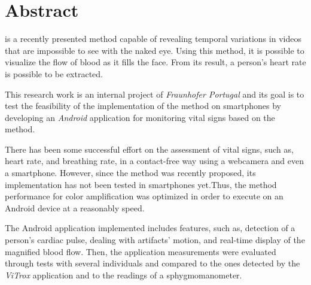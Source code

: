 \chapter*{Abstract}

\evm{} is a recently presented method capable of revealing temporal
variations in videos that are impossible to see with the naked eye.
Using this method, it is possible to visualize the flow of blood as
it fills the face. From its result, a person's heart rate is possible
to be extracted.

This research work is an internal project of \emph{Fraunhofer Portugal}
and its goal is to test the feasibility of the
implementation of the \evm{} method on smartphones by developing
an \emph{Android} application for monitoring vital signs based on
the \evm{} method.

There has been some successful effort on the assessment of vital
signs, such as, heart rate, and breathing rate, in a contact-free
way using a webcamera and even a smartphone. However, since the
\evm{} method was recently proposed, its implementation has not
been tested in smartphones yet.Thus, the \evm{} method performance
for color amplification was optimized in order to execute on an Android
device at a reasonably speed.

The Android application implemented includes features, such as,
detection of a person's cardiac pulse, dealing with artifacts' motion,
and real-time display of the magnified blood flow.
Then, the application measurements were evaluated through tests
with several individuals and compared to the ones detected by
the \emph{ViTrox} application and to the readings of a sphygmomanometer.






